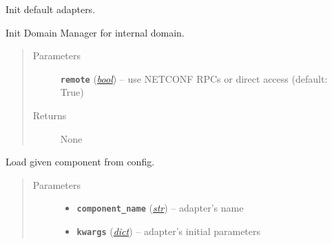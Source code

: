 \documentclass[letterpaper,10pt,english]{sphinxmanual}
\begin{document}
\begin{fulllineitems}
\begin{fulllineitems}
\label{adapt/adaptation:escape.adapt.adaptation.DomainConfigurator.load_default_mgrs}
Init default adapters.

\end{fulllineitems}


\begin{fulllineitems}
\label{adapt/adaptation:escape.adapt.adaptation.DomainConfigurator.load_internal_mgr}
Init Domain Manager for internal domain.
\begin{quote}\begin{description}
\item[{Parameters}] \leavevmode
\textbf{\texttt{remote}} (\href{https://docs.python.org/2.7/library/functions.html\#bool}{\emph{bool}}) -- use NETCONF RPCs or direct access (default: True)

\item[{Returns}] \leavevmode
None

\end{description}\end{quote}

\end{fulllineitems}


\begin{fulllineitems}
\label{adapt/adaptation:escape.adapt.adaptation.DomainConfigurator._DomainConfigurator__load_component}
Load given component from config.
\begin{quote}\begin{description}
\item[{Parameters}] \leavevmode\begin{itemize}
\item {} 
\textbf{\texttt{component\_name}} (\href{https://docs.python.org/2.7/library/functions.html\#str}{\emph{str}}) -- adapter's name

\item {} 
\textbf{\texttt{kwargs}} (\href{https://docs.python.org/2.7/library/stdtypes.html\#dict}{\emph{dict}}) -- adapter's initial parameters


\end{itemize}
\end{description}
\end{quote}
\end{fulllineitems}
\end{fulllineitems}
\end{document}
